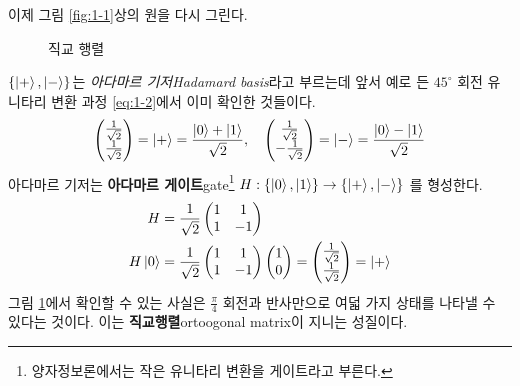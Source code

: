 \documentclass[a4paper,chapter,atbegshi]{oblivoir}
\begin{document}
 이제 그림 \ref{fig:1-1}상의 원을 다시 그린다.
\begin{figure}[h]
\begin{center}
  \caption{직교 행렬\label{fig:1-2}}
\end{center}
\end{figure}
$\{\ket+,\ket-\}$는 \emph{아다마르 기저\tiny Hadamard basis}라고 부르는데
앞서 예로 든 $45^{\circ}$ 회전 유니타리 변환 과정 \ref{eq:1-2}에서 이미
확인한 것들이다. 
\[
  \begin{pmatrix}\frac{1}{\sqrt2}\\\frac{1}{\sqrt2}\end{pmatrix}=\ket+ =
  \frac{\ket0+\ket1}{\sqrt2},\quad\begin{pmatrix}\frac{1}{\sqrt2}\\
  -\frac{1}{\sqrt2}\end{pmatrix} = \ket-=\frac{\ket0-\ket1}{\sqrt2}
\]
아다마르 기저는 \textbf{아다마르 게이트}{\tiny gate}\footnote{양자정보론에서는
작은 유니타리 변환을 게이트라고 부른다.} $H:\{\ket0,\ket1\} \rightarrow
\{\ket+,\ket-\}$ 를 형성한다.
\begin{align*}
  H&=\frac{1}{\sqrt2}\begin{pmatrix}1 & 1 \\ 1 &-1\end{pmatrix}\\
  H\ket0&=\frac{1}{\sqrt2}\begin{pmatrix}1&1\\1&-1\end{pmatrix}
  \begin{pmatrix}1\\0\end{pmatrix} =
  \begin{pmatrix}\frac{1}{\sqrt2}\\\frac{1}{\sqrt2}\end{pmatrix}=\ket+
\end{align*}
그림 \ref{fig:1-2}에서 확인할 수 있는 사실은 $\frac{\pi}{4}$
회전과 반사만으로 여덟 가지 상태를 나타낼 수 있다는 것이다. 이는
\textbf{직교행렬}{\tiny ortoogonal matrix}이 지니는 성질이다.
\end{document}
